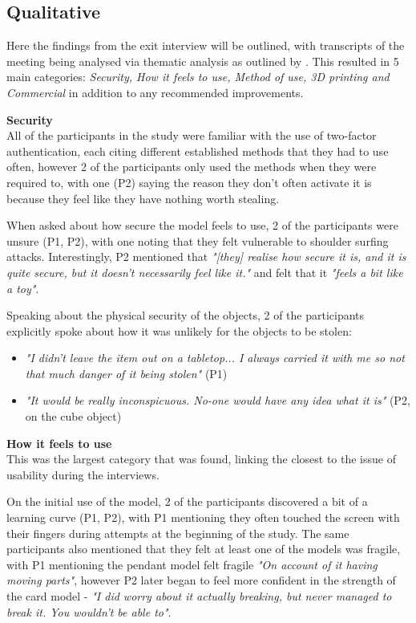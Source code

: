 \documentclass{l4proj}
\begin{document}
\subsection{Qualitative}

Here the findings from the exit interview will be outlined, with transcripts of the meeting being analysed via thematic analysis as outlined by \cite{braun2012thematic}. This resulted in 5 main categories: \textit{Security, How it feels to use, Method of use, 3D printing and Commercial} in addition to any recommended improvements.

\textbf{Security}\\
All of the participants in the study were familiar with the use of two-factor authentication, each citing different established methods that they had to use often, however 2 of the participants only used the methods when they were required to, with one (P2) saying the reason they don't often activate it is because they feel like they have nothing worth stealing.

When asked about how secure the model feels to use, 2 of the participants were unsure (P1, P2), with one noting that they felt vulnerable to shoulder surfing attacks. Interestingly, P2 mentioned that \textit{"[they] realise how secure it is, and it is quite secure, but it doesn't necessarily feel like it."} and felt that it \textit{"feels a bit like a toy"}.

Speaking about the physical security of the objects, 2 of the participants explicitly spoke about how it was unlikely for the objects to be stolen:
\begin{itemize}
    \item \textit{"I didn't leave the item out on a tabletop... I always carried it with me so not that much danger of it being stolen"} (P1)
    \item \textit{"It would be really inconspicuous. No-one would have any idea what it is"} (P2, on the cube object)
\end{itemize}

\textbf{How it feels to use}\\
This was the largest category that was found, linking the closest to the issue of usability during the interviews.

On the initial use of the model, 2 of the participants discovered a bit of a learning curve (P1, P2), with P1 mentioning they often touched the screen with their fingers during attempts at the beginning of the study. The same participants also mentioned that they felt at least one of the models was fragile, with P1 mentioning the pendant model felt fragile \textit{"On account of it having moving parts"}, however P2 later began to feel more confident in the strength of the card model - \textit{"I did worry about it actually breaking, but never managed to break it. You wouldn't be able to"}.
\end{document}
